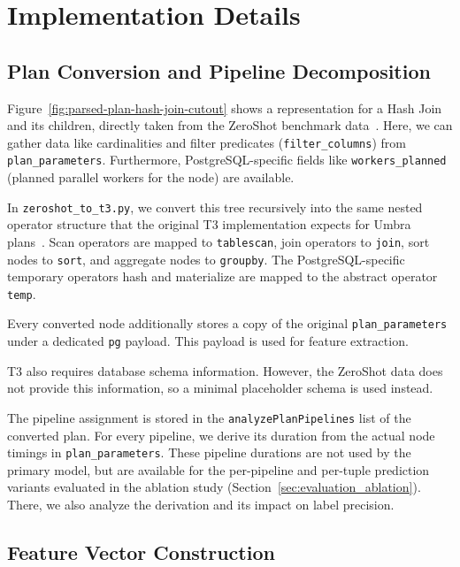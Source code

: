 
\chapter{Implementation Details}\label{chapter:implementation}


\section{Plan Conversion and Pipeline Decomposition}



Figure~\ref{fig:parsed-plan-hash-join-cutout} shows a representation for a Hash Join and its children, directly taken from the ZeroShot benchmark data~\parencite{zeroshot}.
Here, we can gather data like cardinalities and filter predicates (\texttt{filter\_columns}) from \texttt{plan\_parameters}.
Furthermore, PostgreSQL-specific fields like \texttt{workers\_planned} (planned parallel workers for the node) are available.

In \texttt{zeroshot\_to\_t3.py}, we convert this tree recursively into the same nested operator structure
that the original T3 implementation expects
for Umbra plans~\parencite{t3}.
Scan operators are mapped to \texttt{tablescan}, join operators to \texttt{join}, sort nodes to \texttt{sort}, and aggregate nodes to \texttt{groupby}.
The PostgreSQL-specific temporary operators hash and materialize are mapped to the abstract operator \texttt{temp}.

Every converted node additionally stores a copy of the original \texttt{plan\_parameters} under a dedicated \texttt{pg} payload.
This payload is used for feature extraction.

T3 also requires database schema information. However, the ZeroShot data does not provide this information, so a minimal placeholder schema is used instead.

The pipeline assignment is stored in the \texttt{analyzePlanPipelines} list of the converted plan.
For every pipeline, we derive its duration from the actual node timings in \texttt{plan\_parameters}.
These pipeline durations are not used by the primary model,
but are available for the per-pipeline and per-tuple prediction variants evaluated in the ablation study
(Section~\ref{sec:evaluation_ablation}). There, we also analyze the derivation and its impact on label precision.


\section{Feature Vector Construction}

